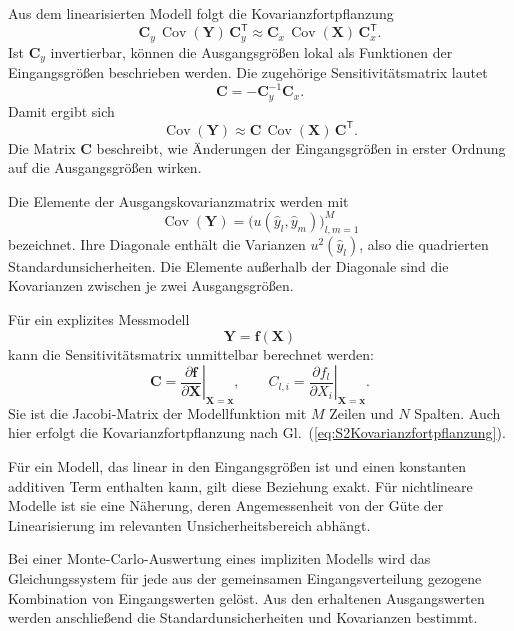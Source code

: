 Aus dem linearisierten Modell folgt die Kovarianzfortpflanzung
\begin{equation}
\mathbf C_y\,\operatorname{Cov}(\mathbf Y)\,\mathbf C_y^{\mathsf T}
\approx
\mathbf C_x\,\operatorname{Cov}(\mathbf X)\,\mathbf C_x^{\mathsf T}.
\end{equation}
Ist $\mathbf C_y$ invertierbar, können die Ausgangsgrößen lokal
als Funktionen der Eingangsgrößen beschrieben werden.
Die zugehörige Sensitivitätsmatrix lautet
\begin{equation}
\mathbf C=-\mathbf C_y^{-1}\mathbf C_x.
\end{equation}
Damit ergibt sich
\begin{equation}
\operatorname{Cov}(\mathbf Y)
\approx
\mathbf C\,\operatorname{Cov}(\mathbf X)\,\mathbf C^{\mathsf T}.
\label{eq:S2Kovarianzfortpflanzung}
\end{equation}
Die Matrix $\mathbf C$ beschreibt, wie Änderungen der Eingangsgrößen
in erster Ordnung auf die Ausgangsgrößen wirken.

Die Elemente der Ausgangskovarianzmatrix werden mit
\begin{equation}
\operatorname{Cov}(\mathbf Y)
=
\bigl(u(\hat y_l,\hat y_m)\bigr)_{l,m=1}^{M}
\end{equation}
bezeichnet. Ihre Diagonale enthält die Varianzen
$u^2(\hat y_l)$, also die quadrierten Standardunsicherheiten.
Die Elemente außerhalb der Diagonale sind die Kovarianzen zwischen
je zwei Ausgangsgrößen.

Für ein explizites Messmodell
\begin{equation}
\mathbf Y=\mathbf f(\mathbf X)
\end{equation}
kann die Sensitivitätsmatrix unmittelbar berechnet werden:
\begin{equation}
\mathbf C
=
\left.
\frac{\partial\mathbf f}{\partial\mathbf X}
\right|_{\mathbf X=\mathbf x},
\qquad
C_{l,i}
=
\left.
\frac{\partial f_l}{\partial X_i}
\right|_{\mathbf X=\mathbf x}.
\end{equation}
Sie ist die Jacobi-Matrix der Modellfunktion mit $M$ Zeilen und
$N$ Spalten. Auch hier erfolgt die Kovarianzfortpflanzung nach
Gl.~(\ref{eq:S2Kovarianzfortpflanzung}).

Für ein Modell, das linear in den Eingangsgrößen ist und einen
konstanten additiven Term enthalten kann, gilt diese Beziehung
exakt. Für nichtlineare Modelle ist sie eine Näherung, deren
Angemessenheit von der Güte der Linearisierung im relevanten
Unsicherheitsbereich abhängt.

Bei einer Monte-Carlo-Auswertung eines impliziten Modells wird
das Gleichungssystem für jede aus der gemeinsamen Eingangsverteilung
gezogene Kombination von Eingangswerten gelöst. Aus den erhaltenen
Ausgangswerten werden anschließend die Standardunsicherheiten
und Kovarianzen bestimmt.


